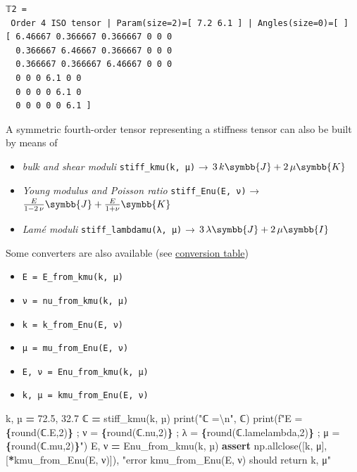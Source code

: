 \documentclass[
  a4paper,
  numbers=noendperiod,
  DIV=12]{scrreprt}
\newenvironment{Shaded}{\begin{snugshade}}{\end{snugshade}}
\newcommand{\BuiltInTok}[1]{#1}
\newcommand{\CharTok}[1]{\textcolor[rgb]{0.31,0.60,0.02}{#1}}
\newcommand{\ControlFlowTok}[1]{\textcolor[rgb]{0.13,0.29,0.53}{\textbf{#1}}}
\newcommand{\DecValTok}[1]{\textcolor[rgb]{0.00,0.00,0.81}{#1}}
\newcommand{\FloatTok}[1]{\textcolor[rgb]{0.00,0.00,0.81}{#1}}
\newcommand{\NormalTok}[1]{#1}
\newcommand{\OperatorTok}[1]{\textcolor[rgb]{0.81,0.36,0.00}{\textbf{#1}}}
\newcommand{\SpecialCharTok}[1]{\textcolor[rgb]{0.81,0.36,0.00}{\textbf{#1}}}
\newcommand{\SpecialStringTok}[1]{\textcolor[rgb]{0.31,0.60,0.02}{#1}}
\newcommand{\StringTok}[1]{\textcolor[rgb]{0.31,0.60,0.02}{#1}}
\providecommand{\tightlist}{%
  \setlength{\itemsep}{0pt}\setlength{\parskip}{0pt}}
\newcommand{\uuuu}[1]{{\symbb{{#1}}}}
\begin{document}
\begin{verbatim}
𝕋2 =
 Order 4 ISO tensor | Param(size=2)=[ 7.2 6.1 ] | Angles(size=0)=[ ]
[ 6.46667 0.366667 0.366667 0 0 0 
  0.366667 6.46667 0.366667 0 0 0 
  0.366667 0.366667 6.46667 0 0 0 
  0 0 0 6.1 0 0 
  0 0 0 0 6.1 0 
  0 0 0 0 0 6.1 ]
\end{verbatim}

A symmetric fourth-order tensor representing a stiffness tensor can also
be built by means of

\begin{itemize}
\tightlist
\item
  \emph{bulk and shear moduli} \texttt{stiff\_kmu(k,\ µ)} →
  \(3\,k \uuuu{J} + 2\,\mu \uuuu{K}\)
\item
  \emph{Young modulus and Poisson ratio} \texttt{stiff\_Enu(E,\ ν)} →
  \(\frac{E}{1-2\,\nu} \uuuu{J} + \frac{E}{1+\nu} \uuuu{K}\)
\item
  \emph{Lamé moduli} \texttt{stiff\_lambdamu(λ,\ μ)} →
  \(3\,\lambda \uuuu{J} + 2\,\mu \uuuu{I}\)
\end{itemize}

Some converters are also available (see
\href{https://en.wikipedia.org/wiki/Lam\%C3\%A9_parameters}{conversion
table})

\begin{itemize}
\tightlist
\item
  \texttt{E\ =\ E\_from\_kmu(k,\ µ)}
\item
  \texttt{ν\ =\ nu\_from\_kmu(k,\ µ)}
\item
  \texttt{k\ =\ k\_from\_Enu(E,\ ν)}
\item
  \texttt{µ\ =\ mu\_from\_Enu(E,\ ν)}
\item
  \texttt{E,\ ν\ =\ Enu\_from\_kmu(k,\ µ)}
\item
  \texttt{k,\ µ\ =\ kmu\_from\_Enu(E,\ ν)}
\end{itemize}

\begin{Shaded}
\begin{Highlighting}[]
\NormalTok{k, µ }\OperatorTok{=} \FloatTok{72.5}\NormalTok{, }\FloatTok{32.7}
\NormalTok{ℂ }\OperatorTok{=}\NormalTok{ stiff\_kmu(k, µ)}
\BuiltInTok{print}\NormalTok{(}\StringTok{"ℂ =}\CharTok{\textbackslash{}n}\StringTok{"}\NormalTok{, ℂ)}
\BuiltInTok{print}\NormalTok{(}\SpecialStringTok{f"E = }\SpecialCharTok{\{}\BuiltInTok{round}\NormalTok{(ℂ.E,}\DecValTok{2}\NormalTok{)}\SpecialCharTok{\}}\SpecialStringTok{ ; ν = }\SpecialCharTok{\{}\BuiltInTok{round}\NormalTok{(ℂ.nu,}\DecValTok{2}\NormalTok{)}\SpecialCharTok{\}}\SpecialStringTok{ ; λ = }\SpecialCharTok{\{}\BuiltInTok{round}\NormalTok{(ℂ.lamelambda,}\DecValTok{2}\NormalTok{)}\SpecialCharTok{\}}\SpecialStringTok{ ; μ = }\SpecialCharTok{\{}\BuiltInTok{round}\NormalTok{(ℂ.mu,}\DecValTok{2}\NormalTok{)}\SpecialCharTok{\}}\SpecialStringTok{"}\NormalTok{)}
\NormalTok{E, ν }\OperatorTok{=}\NormalTok{ Enu\_from\_kmu(k, µ)}
\ControlFlowTok{assert}\NormalTok{ np.allclose([k, μ], [}\OperatorTok{*}\NormalTok{kmu\_from\_Enu(E, ν)]), }\StringTok{"error kmu\_from\_Enu(E, ν) should return k, μ"}
\end{Highlighting}
\end{Shaded}
\end{document}
